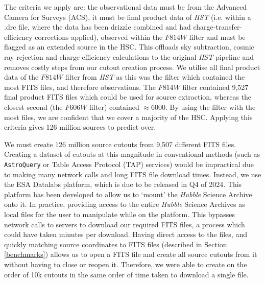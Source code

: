 The criteria we apply are: the observational data must be from the Advanced Camera for Surveys (ACS), it must be final product data of \emph{HST} (i.e. within a .drc file, where the data has been drizzle \citep{2015ASPC..495..281A} combined and had charge-transfer-efficiency corrections applied), observed within the $F814W$ filter and must be flagged as an extended source in the HSC. This offloads sky subtraction, cosmic ray rejection and charge efficiency calculations to the original \emph{HST} pipeline and removes costly steps from our cutout creation process. We utilise all final product data of the $F814W$ filter from \emph{HST} as this was the filter which contained the most FITS files, and therefore observations. The $F814W$ filter contained 9,527 final product FITS files which could be used for source extraction, whereas the closest second (the $F606W$ filter) contained $\approx$6000. By using the filter with the most files, we are confident that we cover a majority of the HSC. Applying this criteria gives 126 million sources to predict over.

We must create 126 million source cutouts from 9,507 different FITS files. Creating a dataset of cutouts at this magnitude in conventional methods (such as \texttt{AstroQuery} or Table Access Protocol (TAP) services) would be impractical due to making many network calls and long FITS file download times. Instead, we use the ESA Datalabs platform, which is due to be released in Q4 of 2024. This platform has been developed to allow us to `mount' the \emph{Hubble} Science Archive onto it. In practice, providing access to the entire \emph{Hubble} Science Archives as local files for the user to manipulate while on the platform. This bypasses network calls to servers to download our required FITS files, a process which could have taken minutes per download. Having direct access to the files, and quickly matching source coordinates to FITS files (described in Section \ref{benchmarks}) allows us to open a FITS file and create all source cutouts from it without having to close or reopen it. Therefore, we were able to create on the order of 10k cutouts in the same order of time taken to download a single file.


